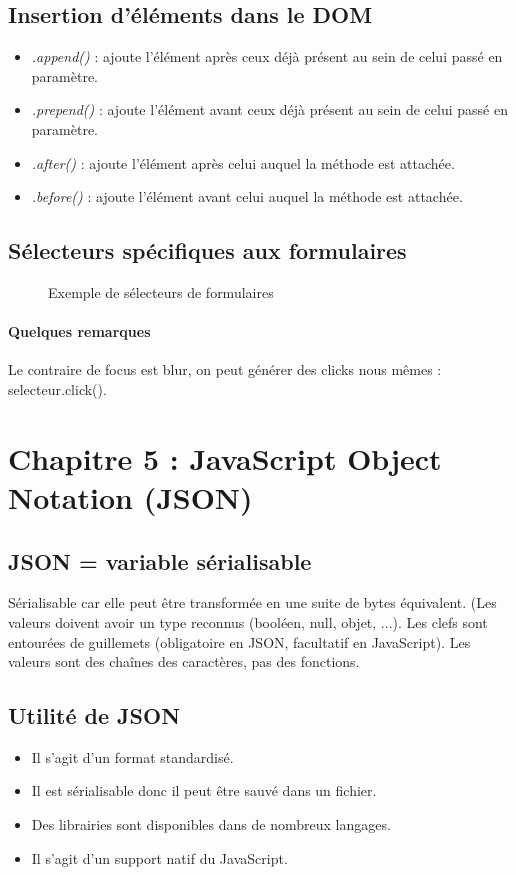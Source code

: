 \documentclass{article}[12pt]
\begin{document}
\subsection{Insertion d'éléments dans le DOM}
\begin{itemize}
	\item \emph{.append()} : ajoute l'élément après ceux déjà présent au sein de celui passé en paramètre.
    \item \emph{.prepend()} : ajoute l'élément avant ceux déjà présent au sein de celui passé en paramètre.
   	\item \emph{.after()} : ajoute l'élément après celui auquel la méthode est attachée.
    \item \emph{.before()} : ajoute l'élément avant celui auquel la méthode est attachée.
\end{itemize}
\subsection{Sélecteurs spécifiques aux formulaires}
\begin{figure}[H]
	\centering
    \caption{Exemple de sélecteurs de formulaires}
\end{figure}
\paragraph{Quelques remarques} Le contraire de focus est blur, on peut générer des clicks nous mêmes : selecteur.click().
\section{Chapitre 5 : JavaScript Object Notation (JSON)}
\subsection{JSON = variable sérialisable}
Sérialisable car elle peut être transformée en une suite de bytes équivalent. (Les valeurs doivent avoir un type reconnus (booléen, null, objet, ...). Les clefs sont entourées de guillemets (obligatoire en JSON, facultatif en JavaScript). Les valeurs sont des chaînes des caractères, pas des fonctions.
\subsection{Utilité de JSON}
\begin{itemize}
	\item Il s'agit d'un format standardisé.
    \item Il est sérialisable donc il peut être sauvé dans un fichier.
    \item Des librairies sont disponibles dans de nombreux langages.
    \item Il s'agit d'un support natif du JavaScript.
\end{itemize}
\end{document}
